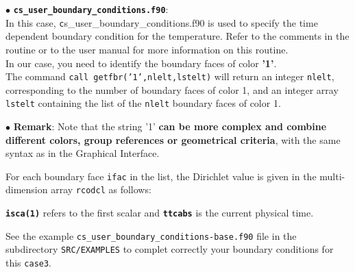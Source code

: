 $\bullet$ \textbf{\texttt{cs\_user\_boundary\_conditions.f90}}:\\
In this case, {\texttt cs\_user\_boundary\_conditions.f90} is used to specify the time dependent boundary
condition for the temperature. Refer to the comments in the routine or to the \CS user manual
for more information on this routine.\\

In our case, you need to identify the boundary faces of color \textbf{'1'}.\\
The command \texttt{call getfbr('1',nlelt,lstelt)} will return an integer \texttt{nlelt}, corresponding
to the number of boundary faces of color 1, and an integer array \texttt{lstelt} containing the list
of the \texttt{nlelt} boundary faces of color 1.

$\bullet$ {\bf Remark}: Note that the string '1' \textbf{can be more complex and combine
different colors, group references or geometrical criteria}, with the same syntax
as in the Graphical Interface.

For each boundary face \texttt{ifac} in the list, the Dirichlet value is given in the
multi-dimension array \texttt{rcodcl} as follows:




\textbf{\texttt{isca(1)}} refers to the first scalar and {\textbf\texttt{ttcabs}}
is the current physical time.

See the example \texttt{cs\_user\_boundary\_conditions-base.f90} file in the subdirectory
\texttt{SRC/EXAMPLES} to complet correctly your boundary conditions for this \texttt{case3}.

